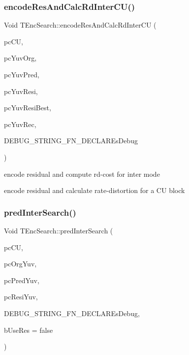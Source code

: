 \subsubsection{\texorpdfstring{encode\+Res\+And\+Calc\+Rd\+Inter\+C\+U()}{encodeResAndCalcRdInterCU()}}
{\footnotesize\ttfamily Void T\+Enc\+Search\+::encode\+Res\+And\+Calc\+Rd\+Inter\+CU (\begin{DoxyParamCaption}\item[{\hyperlink{class_t_com_data_c_u}{T\+Com\+Data\+CU} $\ast$}]{pc\+CU,  }\item[{\hyperlink{class_t_com_yuv}{T\+Com\+Yuv} $\ast$}]{pc\+Yuv\+Org,  }\item[{\hyperlink{class_t_com_yuv}{T\+Com\+Yuv} $\ast$}]{pc\+Yuv\+Pred,  }\item[{\hyperlink{class_t_com_yuv}{T\+Com\+Yuv} $\ast$}]{pc\+Yuv\+Resi,  }\item[{\hyperlink{class_t_com_yuv}{T\+Com\+Yuv} $\ast$}]{pc\+Yuv\+Resi\+Best,  }\item[{\hyperlink{class_t_com_yuv}{T\+Com\+Yuv} $\ast$}]{pc\+Yuv\+Rec,  }\item[{Bool b\+Skip\+Residual }]{D\+E\+B\+U\+G\+\_\+\+S\+T\+R\+I\+N\+G\+\_\+\+F\+N\+\_\+\+D\+E\+C\+L\+A\+REs\+Debug }\end{DoxyParamCaption})}



encode residual and compute rd-\/cost for inter mode 

encode residual and calculate rate-\/distortion for a CU block \mbox{\label{class_t_enc_search_a60b4d9f294aa8b0c1d03f4be57e707b5}} 
\subsubsection{\texorpdfstring{pred\+Inter\+Search()}{predInterSearch()}}
{\footnotesize\ttfamily Void T\+Enc\+Search\+::pred\+Inter\+Search (\begin{DoxyParamCaption}\item[{\hyperlink{class_t_com_data_c_u}{T\+Com\+Data\+CU} $\ast$}]{pc\+CU,  }\item[{\hyperlink{class_t_com_yuv}{T\+Com\+Yuv} $\ast$}]{pc\+Org\+Yuv,  }\item[{\hyperlink{class_t_com_yuv}{T\+Com\+Yuv} $\ast$}]{pc\+Pred\+Yuv,  }\item[{\hyperlink{class_t_com_yuv}{T\+Com\+Yuv} $\ast$}]{pc\+Resi\+Yuv,  }\item[{\hyperlink{class_t_com_yuv}{T\+Com\+Yuv} $\ast$pc\+Reco\+Yuv }]{D\+E\+B\+U\+G\+\_\+\+S\+T\+R\+I\+N\+G\+\_\+\+F\+N\+\_\+\+D\+E\+C\+L\+A\+REs\+Debug,  }\item[{Bool}]{b\+Use\+Res = {\ttfamily false} }\end{DoxyParamCaption})}



